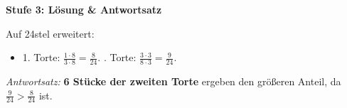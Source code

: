 \documentclass[a4paper,10pt]{article}
\newcommand{\mFrac}[2]{\frac{#1}{#2}}
\begin{document}
\begin{tcolorbox}[
    enhanced, colback=white, colframe=primaryBlue, arc=3mm, boxrule=1.2pt,
    left=4.5mm, right=4.5mm, top=2.5mm, bottom=2.5mm, height=12.9cm
]
    \begin{tcolorbox}[colback=step3Bg, colframe=step3Border, arc=2mm, boxrule=0.7pt, left=3mm, right=3mm, top=1.8mm, bottom=1.8mm]
        {\color{step3Text}\bfseries\faCheckCircle\enskip Stufe 3: Lösung \& Antwortsatz}\\[0.8mm]
        {\small
        Auf 24stel erweitert:
        \begin{itemize}[leftmargin=4mm, itemsep=0.2pt, topsep=1pt]
            \item 1. Torte: $\mFrac{1\cdot 8}{3\cdot 8} = \mFrac{8}{24}$. . Torte: $\mFrac{3\cdot 3}{8\cdot 3} = \mFrac{9}{24}$.
        \end{itemize}
        \textit{Antwortsatz:} \textbf{6 Stücke der zweiten Torte} ergeben den größeren Anteil, da $\mFrac{9}{24} > \mFrac{8}{24}$ ist.
        }
    \end{tcolorbox}
\end{tcolorbox}

\newpage

\end{document}
